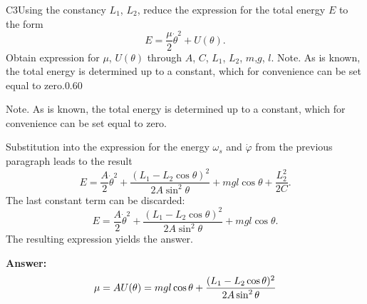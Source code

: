 \documentclass[11pt,a4paper]{article}
\begin{document}
\begin{solcard}{C3}{Using the constancy $L_1$, $L_2$, reduce the expression for the total energy $E$ to the form $$E = \frac{\mu}{2} \dot{\theta}^2 + U(\theta).$$ Obtain expression for $\mu$, $U(\theta)$ through $A$, $C$, $L_1$, $L_2$, $m$,$g$, $l$. Note. As is known, the total energy is determined up to a constant, which for convenience can be set equal to zero.}{0.60}

Note. As is known, the total energy is determined up to a constant, which for convenience can be set equal to zero.


Substitution into the expression for the energy $\omega_s$ and $\dot{\varphi}$ from the previous paragraph leads to the result $$E = \frac{A}{2} \dot\theta^2+\frac{(L_1 - L_2 \cos\theta)^2}{2 A \sin^2\theta} + mgl \cos\theta + \frac{L_2^2}{2C}.$$ The last constant term can be discarded: $$E = \frac{A}{2} \dot\theta^2+\frac{(L_1 - L_2 \cos\theta)^2}{2 A \sin^2\theta} + mgl \cos\theta.$$ The resulting expression yields the answer.

\par\smallskip\noindent\textbf{Answer:} $$ \mu = A \\ U(\theta) = mgl\cos{\theta} + \frac{(L_1 - L_2\cos{\theta})^2}{2A\sin^2{\theta}} $$
\end{solcard}
\end{document}
